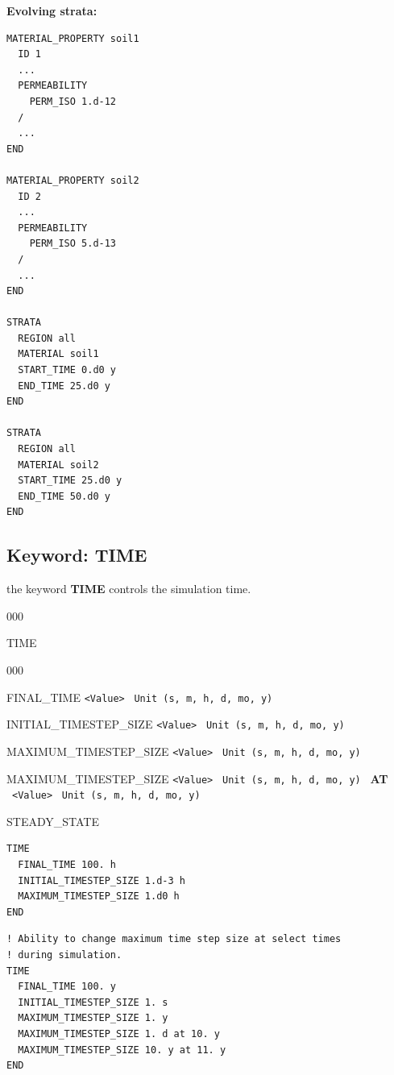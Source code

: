 \normalsize

\begin{mdframed}
\noindent
{\bf Evolving strata:}
\footnotesize
\begin{verbatim}
MATERIAL_PROPERTY soil1
  ID 1
  ...
  PERMEABILITY
    PERM_ISO 1.d-12
  /
  ...
END

MATERIAL_PROPERTY soil2
  ID 2
  ...
  PERMEABILITY
    PERM_ISO 5.d-13
  /
  ...
END

STRATA
  REGION all
  MATERIAL soil1
  START_TIME 0.d0 y
  END_TIME 25.d0 y
END

STRATA
  REGION all
  MATERIAL soil2
  START_TIME 25.d0 y
  END_TIME 50.d0 y
END
\end{verbatim}
\normalsize
\end{mdframed}

\hyperlink{target_key}{\return}


\newpage
\protect\hypertarget{target_time}{}
\subsection{Keyword: TIME}

\hfill\hyperlink{target_key}{\return}

 the keyword {\bf TIME} controls the simulation time.

\begin{deflist}{000}
\item[TIME] ~
\begin{deflist}{000}
\item[FINAL\_TIME] {\tt <Value>} \ {\tt Unit (s, m, h, d, mo, y)}
\item[INITIAL\_TIMESTEP\_SIZE] {\tt <Value>} \ {\tt Unit (s, m, h, d, mo, y)}
\item[MAXIMUM\_TIMESTEP\_SIZE] {\tt <Value>} \ {\tt Unit (s, m, h, d, mo, y)}
\item[MAXIMUM\_TIMESTEP\_SIZE] {\tt <Value>} \ {\tt Unit (s, m, h, d, mo, y)} \ {\bf AT} \ {\tt <Value>} \ {\tt Unit (s, m, h, d, mo, y)}
\item[STEADY\_STATE]
\end{deflist}
\item[\keyend]
\end{deflist}


\begin{mdframed}

\footnotesize
\begin{verbatim}
TIME
  FINAL_TIME 100. h
  INITIAL_TIMESTEP_SIZE 1.d-3 h
  MAXIMUM_TIMESTEP_SIZE 1.d0 h
END
\end{verbatim}

\begin{verbatim}
! Ability to change maximum time step size at select times 
! during simulation.
TIME
  FINAL_TIME 100. y
  INITIAL_TIMESTEP_SIZE 1. s
  MAXIMUM_TIMESTEP_SIZE 1. y
  MAXIMUM_TIMESTEP_SIZE 1. d at 10. y
  MAXIMUM_TIMESTEP_SIZE 10. y at 11. y
END
\end{verbatim}
\normalsize
\end{mdframed}

